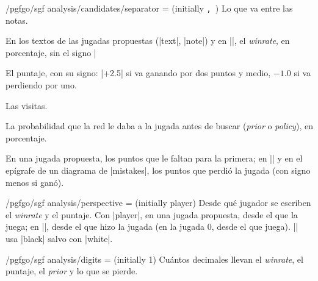 \begin{key}{/pgfgo/sgf analysis/candidates/separator =  (initially \texttt{,\string~})}
	Lo que va entre las notas.
\end{key}

\begin{command}{\pgfgowinrate}
	En los textos de las jugadas propuestas (|text|, |note|) y en |\sgfinfo|, el \emph{winrate}, en porcentaje, sin el signo |%
\end{command}

\begin{command}{\pgfgolead}
	El puntaje, con su signo: |+2.5| si va ganando por dos puntos y medio, $-1.0$ si va perdiendo por uno.
\end{command}

\begin{command}{\pgfgovisits}
	Las visitas.
\end{command}

\begin{command}{\pgfgoprior}
	La probabilidad que la red le daba a la jugada antes de buscar (\emph{prior} o \emph{policy}), en porcentaje.
\end{command}

\begin{command}{\pgfgoloss}
	En una jugada propuesta, los puntos que le faltan para la primera; en |\sgfinfo| y en el epígrafe de un diagrama de |mistakes|, los puntos que perdió la jugada (con signo menos si ganó).
\end{command}

\begin{key}{/pgfgo/sgf analysis/perspective =  (initially player)}
	Desde qué jugador se escriben el \emph{winrate} y el puntaje. Con |player|, en una jugada propuesta, desde el que la juega; en |\sgfinfo|, desde el que hizo la jugada (en la jugada 0, desde el que juega). |\sgfgraph| usa |black| salvo con |white|.
\end{key}

\begin{key}{/pgfgo/sgf analysis/digits =  (initially 1)}
	Cuántos decimales llevan el \emph{winrate}, el puntaje, el \emph{prior} y lo que se pierde.

	\begin{codeexample}[]
		\begin{goban}[9, scale = 0.6]
		\end{goban}
		\pgfgocandidates[perspective = black, digits = 2]
	\end{codeexample}
\end{key}

